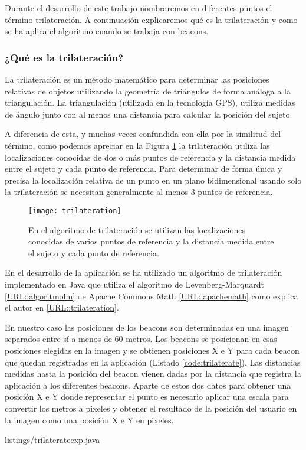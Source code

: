 Durante el desarrollo de este trabajo nombraremos en diferentes puntos el término trilateración. A continuación explicaremos qué es la trilateración y como se ha aplica el algoritmo cuando se trabaja con beacons.

\subsubsection{¿Qué es la trilateración?}


La trilateración es un método matemático para determinar las posiciones relativas de objetos utilizando la geometría de triángulos de forma análoga a la triangulación. La triangulación (utilizada en la tecnología GPS), utiliza medidas de ángulo junto con al menos una distancia para calcular la posición del sujeto. 


A diferencia de esta, y muchas veces confundida con ella por la similitud del término, como podemos apreciar en la Figura \ref{fig:trilateration} la trilateración utiliza las localizaciones conocidas de dos o más puntos de referencia y la distancia medida entre el sujeto y cada punto de referencia. Para determinar de forma única y precisa la localización relativa de un punto en un plano bidimensional usando solo la trilateración se necesitan generalmente al menos 3 puntos de referencia.

\begin{figure}[H]
	\centering
	\texttt{[image: trilateration]}
	\caption{En el algoritmo de trilateración se utilizan las localizaciones conocidas de varios puntos de referencia y la distancia medida entre el sujeto y cada punto de referencia.}
	\label{fig:trilateration}
\end{figure}


En el desarrollo de la aplicación se ha utilizado un algoritmo de trilateración implementado en Java que utiliza el algoritmo de Levenberg-Marquardt \ref{URL::algoritmolm} de Apache Commons Math \ref{URL::apachemath} como explica el autor en \ref{URL::trilateration}. 


En nuestro caso las posiciones de los beacons son determinadas en una imagen separados entre sí a menos de 60 metros. Los beacons se posicionan en esas posiciones elegidas en la imagen y se obtienen posiciones X e Y para cada beacon que quedan registradas en la aplicación (Listado \ref{code:trilaterate}). Las distancias medidas hasta la posición del beacon vienen dadas por la distancia que registra la aplicación a los diferentes beacons. Aparte de estos dos datos para obtener una posición X e Y donde representar el punto es necesario aplicar una escala para convertir los metros a pixeles y obtener el resultado de la posición del usuario en la imagen como una posición X e Y en pixeles.


{listings/trilaterateexp.java} %
